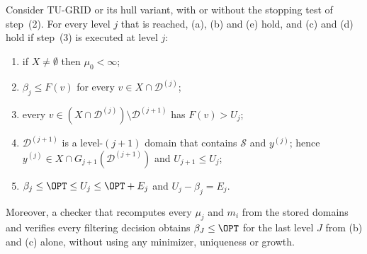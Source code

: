 \begin{proposition}[Soundness]\label{prop:tu-sound}
Consider TU-GRID or its hull variant, with or without the stopping test of
step~(2). For every level $j$ that is reached, (a), (b) and (e) hold, and
(c) and (d) hold if step~(3) is executed at level $j$:
\begin{enumerate}[label=(\alph*)]
\item if $X\ne\emptyset$ then $\mu_0<\infty$;
\item $\beta_j\le F(v)$ for every $v\in X\cap\mathcal D^{(j)}$;
\item every $v\in(X\cap\mathcal D^{(j)})\setminus\mathcal D^{(j+1)}$ has
$F(v)>U_j$;
\item $\mathcal D^{(j+1)}$ is a level-$(j+1)$ domain that contains $\mathcal S$
and $y^{(j)}$; hence $y^{(j)}\in X\cap G_{j+1}(\mathcal D^{(j+1)})$ and
$U_{j+1}\le U_j$;
\item $\beta_j\le\OPT\le U_j\le\OPT+E_j$ and $U_j-\beta_j=E_j$.
\end{enumerate}
Moreover, a checker that recomputes every $\mu_j$ and $m_i$ from the stored
domains and verifies every filtering decision obtains $\beta_J\le\OPT$ for
the last level $J$ from (b) and (c) alone, without using any minimizer,
uniqueness or growth.
\end{proposition}

